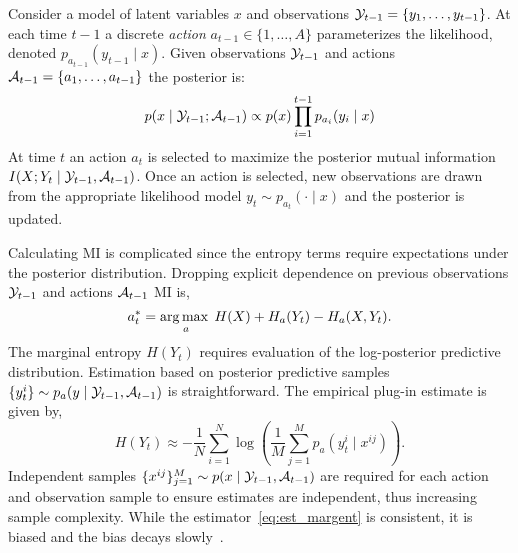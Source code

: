 Consider a model of latent variables $x$ and observations $\mathcal{Y}_{t-1}
= \{y_1,\ldots,y_{t-1}\}$.  At each time $t-1$ a discrete
\emph{action} $a_{t-1} \in \{1,\ldots,A\}$ parameterizes the
likelihood, denoted \mbox{$p_{a_{t-1}}(y_{t-1} \mid x)$}.  Given
observations $\mathcal{Y}_{t-1}$ and actions $\mathcal{A}_{t-1} =
\{a_1,\ldots,a_{t-1}\}$ the posterior is:
\begin{equation}\label{eq:joint}
  p(x\mid \mathcal{Y}_{t-1}; \mathcal{A}_{t-1}) \propto p(x)
    \prod_{i=1}^{t-1} p_{a_i}(y_i \mid x) 
\end{equation}
At time $t$ an action $a_t$ is selected to maximize the posterior
mutual information \mbox{$I(X;Y_t \mid \mathcal{Y}_{t-1}, \mathcal{A}_{t-1})$}.
Once an action is selected, new observations are drawn from the
appropriate likelihood model $y_t \sim p_{a_t}(\cdot \mid x)$ and
the posterior is updated.

Calculating MI is complicated since the entropy terms require
expectations under the posterior distribution.  Dropping explicit
dependence on previous observations $\mathcal{Y}_{t-1}$ and actions
$\mathcal{A}_{t-1}$ MI is,
\begin{equation}
  a_t^{*} = \operatorname*{arg\,max\;}_a H(X) + H_a(Y_t) - H_a(X, Y_t). \notag
\end{equation}
The marginal entropy $H(Y_t)$ requires evaluation of the log-posterior
predictive distribution.  Estimation based on posterior predictive
samples $\{y^i_t\} \sim p_a(y\mid \mathcal{Y}_{t-1}, \mathcal{A}_{t-1})$ is
straightforward.  The empirical plug-in estimate is given by,
\begin{equation}\label{eq:est_margent}
  H(Y_t) \approx - \frac{1}{N} \sum_{i=1}^N \log\left( \frac{1}{M}
  \sum_{j=1}^M p_a(y_t^i \mid x^{ij}) \right).
\end{equation}
Independent samples $\{x^{ij}\}_{j=1}^M \sim p(x \mid \mathcal{Y}_{t-1},
\mathcal{A}_{t-1})$ are required for each action and observation sample to
ensure estimates are independent, thus increasing sample complexity.
While the estimator~\eqref{eq:est_margent} is consistent, it is biased
and the bias decays slowly~\citep{zheng2018robust,
  rainforth2018nesting}.

